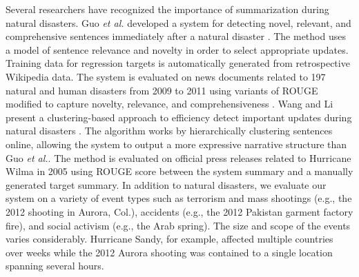 Several researchers have recognized the importance of summarization during
natural disasters.  Guo \textit{et al.} developed a system for detecting
novel, relevant, and comprehensive sentences immediately after a natural
disaster \cite{qi:temporal-summarization}.  The method uses a model of
sentence relevance and novelty in order to select appropriate updates.
Training data for regression targets is automatically generated from
retrospective Wikipedia data.  The system is evaluated on news documents
related to 197 natural and human disasters from 2009 to 2011 using variants of
ROUGE modified to capture novelty, relevance, and comprehensiveness
\cite{lin2004rouge}.  Wang and Li present a clustering-based approach to
efficiency detect important updates during natural disasters
\cite{wang:update-summarization}.  The algorithm works by hierarchically
clustering sentences online, allowing the system to output a more expressive
narrative structure than Guo \textit{et al.}.  The method is evaluated on
official press releases related to Hurricane Wilma  in 2005 using ROUGE score
between the system summary and a manually generated target summary. In addition
to natural disasters, we evaluate our system on a variety of event types 
 such as terrorism and mass shootings (e.g., the 2012
shooting in Aurora, Col.), accidents
(e.g., the 2012 Pakistan garment factory fire), and social activism (e.g., the
Arab spring). The size and scope of the events varies considerably. Hurricane
Sandy, for example, affected multiple countries over weeks while the
2012 Aurora shooting was contained to a single location spanning several hours.



